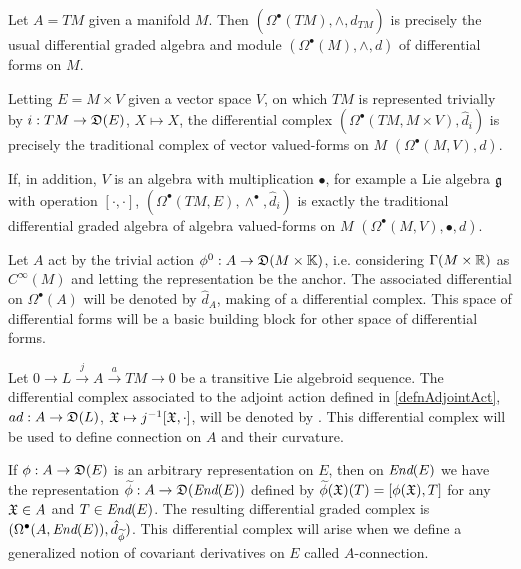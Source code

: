 \lin

\begin{example}\label{exampleTraditionalCaseTangentBundleUpToDifferential}
Let $A = TM$ given a manifold $M$. Then $(\Omega^\bullet (TM), \wedge, \hat d_{TM})$ is precisely the usual differential graded algebra and module $(\Omega^\bullet (M), \wedge, d)$ of differential forms on $M$.

\noindent Letting $E = M \times V$ given a vector space $V$, on which $TM$ is represented trivially by $i: TM \to \mathfrak{D}(E)$, $X \mapsto X$, the differential complex $(\Omega^\bullet(TM, M \times V), \hat d_i)$ is precisely the traditional complex of vector valued-forms on $M$ $(\Omega^\bullet(M, V), d)$. 

\noindent If, in addition, $V$ is an algebra with multiplication $\bullet$, for example a Lie algebra $\mathfrak{g}$ with operation $[\cdot, \cdot]$, $(\Omega^\bullet(TM, E), \wedge^\bullet, \hat d_i)$ is exactly the traditional differential graded algebra of algebra valued-forms on $M$ $(\Omega^\bullet(M, V), \bullet, d)$.
\end{example}

\begin{example}\label{exampleScalarValuedFormsOnAUpToDifferential}
Let $A$ act by the trivial action $\phi^0: A \to \alg D(M \times \bb K)$, i.e. considering $\Gamma(M \times \mathbb{R})$ as $C^\infty(M)$ and letting the representation be the anchor. The associated differential on $\Omega^\bullet(A)$ will be denoted by $\hat d_A$, making of  a differential complex. This space of differential forms will be a basic building block for other space of differential forms.
\end{example}

\begin{example}\label{exampleLValuedFormsonTransitiveAUpToDifferential}
Let $0 \to L \xrightarrow{j} A \xrightarrow{a} TM \to 0$ be a transitive Lie algebroid sequence.
The differential complex associated to the adjoint action defined in \ref{defnAdjointAct}, $ad: A \to \mathfrak{D}(L)$, $\mathfrak{X} \mapsto j^{-1}[\mathfrak{X}, \cdot]$, will be denoted by .
This differential complex will be used to define connection on $A$ and their curvature.
\end{example}


\begin{example}\label{exampleEndEValuedFormsOnTRAnsitiveUpToDifferential}
If $\phi: A \to \alg D(E)$ is an arbitrary representation on $E$, then on $\operatorname{\textit{End}}(E)$ we have the representation $\tilde \phi: A \to \alg D(\End(E))$ defined by $\tilde \phi(\oid X)(T) = [\phi(\oid X), T]$ for any $\mathfrak{X} \in A$ and $T \in \operatorname{\textit{End}}(E)$. 
The resulting differential graded complex is $(\Omega^\bullet(A, \End(E)), \hat d_{\tilde \phi})$. This differential complex will arise when we define a generalized notion of covariant derivatives on $E$ called $A$-connection.
\end{example}

